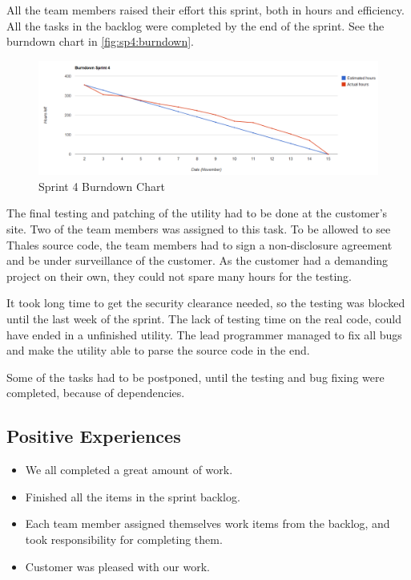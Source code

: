 All the team members raised their effort this sprint, both in hours and efficiency. All the tasks in the backlog were completed by the end of the sprint. See the burndown chart in \autoref{fig:sp4:burndown}.
\begin{figure}[!htb]
	\includegraphics[width=\textwidth]{./sprints/img/burndown_chart_s4}
	\caption{Sprint 4 Burndown Chart\label{fig:sp4:burndown}}
\end{figure}

The final testing and patching of the utility had to be done at the customer's site. Two of the team members was assigned to this task. To be allowed to see Thales source code, the team members had to sign a non-disclosure agreement and be under surveillance of the customer. As the customer had a demanding project on their own, they could not spare many hours for the testing.

It took long time to get the security clearance needed, so the testing was blocked until the last week of the sprint. The lack of testing time on the real code, could have ended in a unfinished utility. The lead programmer managed to fix all bugs and make the utility able to parse the source code in the end.

Some of the tasks had to be postponed, until the testing and bug fixing were completed, because of dependencies. 

\subsection{Positive Experiences}
\begin{itemize}
	\item We all completed a great amount of work.
	\item Finished all the items in the sprint backlog.
	\item Each team member assigned themselves work items from the backlog, and took responsibility for completing them.
	\item Customer was pleased with our work.
\end{itemize}

